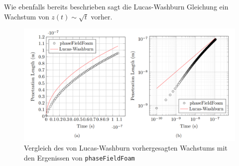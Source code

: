 Wie ebenfalls bereits beschrieben sagt die Lucas-Washburn Gleichung ein Wachstum von $z(t)\sim \sqrt{t}$ vorher. 

\begin{figure}[h]
    \centering
    \includegraphics[width=.95\textwidth]{Pictures/LW-PFF_comp.png}
    \caption{Vergleich des von Lucas-Washburn vorhergesagten Wachstums mit den Ergenissen von \texttt{phaseFieldFoam}}
    \label{fig: LW-PFF_comp}
\end{figure}